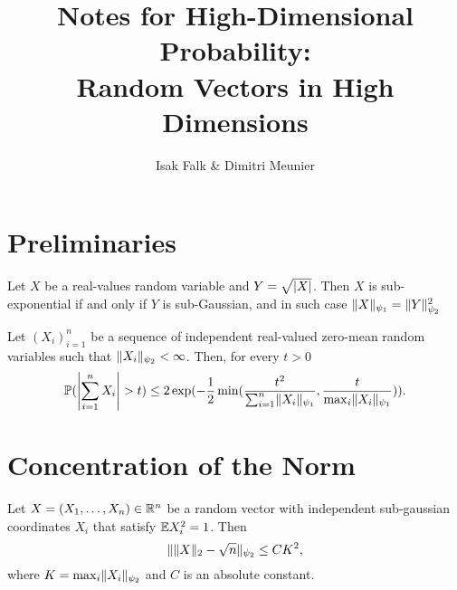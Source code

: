 \documentclass{article}
\title{Notes for High-Dimensional Probability:\\ Random Vectors in High Dimensions}
\author{%
  Isak Falk \& Dimitri Meunier
}
\begin{document}
\maketitle

\section{Preliminaries}

\begin{proposition}
  \label{prop:sub-gauss-sub-exp-norm-relation}
  Let \(X\) be a real-values random variable and \(Y = \sqrt{\abs{X}}\). Then
  \(X\) is sub-exponential if and only if \(Y\) is sub-Gaussian, and in such
  case \(\norm{X}_{\psi_{1}} = \norm{Y}_{\psi_{2}}^{2}\)
\end{proposition}

\begin{theorem}
  \label{thm:bernsteins-ineq}
  Let \((X_{i})_{i=1}^{n}\) be a sequence of independent real-valued zero-mean
  random variables such that \(\norm{X_{i}}_{\psi_{2}} < \infty\). Then, for
  every \(t > 0\)
  \begin{equation}
    \Pr(\abs*{\sum_{i=1}^{n}X_{i}} > t) \leq 2\exp(-\frac{1}{2}\min(\frac{t^{2}}{\sum_{i=1}^{n}\norm{X_{i}}_{\psi_{1}}}, \frac{t}{\max_{i}\norm{X_{i}}_{\psi_{1}}})).
  \end{equation}
\end{theorem}


\section{Concentration of the Norm}
\begin{theorem}
Let \(X = (X_{1}, \dots, X_{n}) \in \R^{n}\) be a random vector with independent
sub-gaussian coordinates \(X_{i}\) that satisfy \(\E X_{i}^{2} = 1\). Then
\begin{equation}
  \norm{\norm{X}_{2} - \sqrt{n}}_{\psi_{2}} \leq CK^{2},
\end{equation}
where \(K = \max_{i} \norm{X_{i}}_{\psi_{2}}\) and \(C\) is an absolute constant.
\end{theorem}
\end{document}
